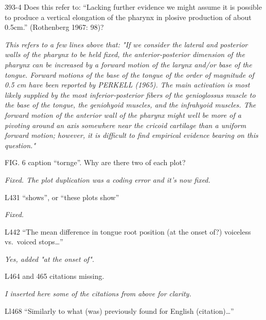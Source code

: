 \documentclass[]{article}
\begin{document}
393-4 Does this refer to: ``Lacking further evidence we might assume it
is possible to produce a vertical elongation of the pharynx in plosive
production of about 0.5cm.'' (Rothenberg 1967: 98)?

\begin{adjustwidth}{1cm}{} \textit{
This refers to a few lines above that: "If we consider the lateral and posterior walls of the pharynx to be held fixed, the anterior-posterior dimension of the pharynx can be increased by a forward motion of the larynx and/or base of the tongue. Forward motions of the base of the tongue of the order of magnitude of 0.5 cm have been reported by PERKELL (1965). The main activation is most likely supplied by the most inferior-posterior fibers of the genioglossus muscle to the base of the tongue, the geniohyoid muscles, and the infrahyoid muscles. The forward motion of the anterior wall of the pharynx might well be more of a pivoting around an axis somewhere near the cricoid cartilage than a uniform forward motion; however, it is difficult to find empirical evidence bearing on this question."
} \end{adjustwidth}

FIG. 6 caption ``tornge''. Why are there two of each plot?

\begin{adjustwidth}{1cm}{} \textit{
Fixed. The plot duplication was a coding error and it's now fixed.
} \end{adjustwidth}

L431 ``shows'', or ``these plots show''

\begin{adjustwidth}{1cm}{} \textit{
Fixed.
} \end{adjustwidth}

L442 ``The mean difference in tongue root position (at the onset of?)
voiceless vs.~voiced stops\ldots{}''

\begin{adjustwidth}{1cm}{} \textit{
Yes, added "at the onset of".
} \end{adjustwidth}

L464 and 465 citations missing.

\begin{adjustwidth}{1cm}{} \textit{
I inserted here some of the citations from above for clarity.
} \end{adjustwidth}

Ll468 ``Similarly to what (was) previously found for English
(citation)\ldots{}''
\end{document}
